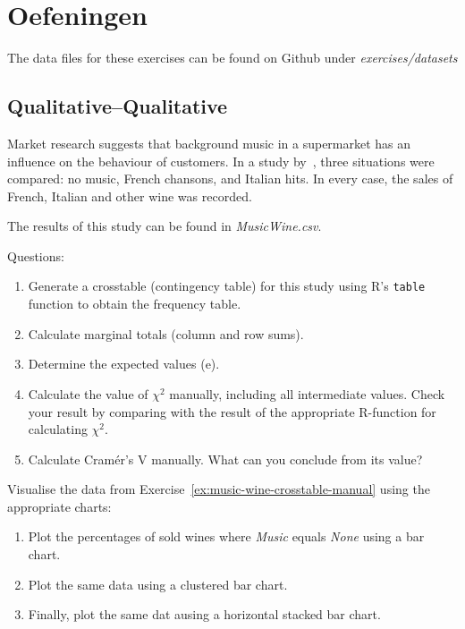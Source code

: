 \section{Oefeningen}
\label{sec:analyse op 2 variabelen-oefeningen}

The data files for these exercises can be found on Github under \emph{exercises/datasets}

\subsection{Qualitative--Qualitative}
\label{ssec:ex-qualitative-qualitative}

\begin{exercise}
  \label{ex:music-wine-crosstable-manual} %
  
  Market research suggests that background music in a supermarket has an influence on the behaviour of customers. In a study by~\textcite{Ryan1998}, three situations were compared: no music, French chansons, and Italian hits. In every case, the sales of French, Italian and other wine was recorded.
  
  The results of this study can be found in \emph{MusicWine.csv}. 
  
  Questions:
  \begin{enumerate}
    \item Generate a crosstable (contingency table) for this study using R's \texttt{table} function to obtain the frequency table.
    \item Calculate marginal totals (column and row sums).
    \item Determine the expected values (e).
    \item Calculate the value of $\chi^{2}$ manually, including all intermediate values. Check your result by comparing with the result of the appropriate R-function for calculating $\chi^{2}$.
    \item Calculate Cramér's V manually. What can you conclude from its value?
  \end{enumerate}
\end{exercise}

\begin{exercise}
  \label{ex:ex:music-wine-crosstable-visualization}
  Visualise the data from Exercise~\ref{ex:music-wine-crosstable-manual} using the appropriate charts:

  \begin{enumerate}
    \item Plot the percentages of sold wines where \emph{Music} equals \emph{None} using a bar chart.
    \item Plot the same data using a clustered bar chart.
    \item Finally, plot the same dat ausing a horizontal stacked bar chart.
  \end{enumerate}
\end{exercise}

